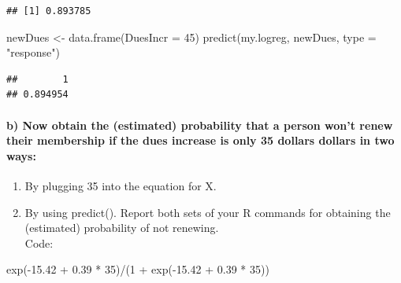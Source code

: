 \documentclass[
]{article}
\newenvironment{Shaded}{\begin{snugshade}}{\end{snugshade}}
\newcommand{\AttributeTok}[1]{\textcolor[rgb]{0.77,0.63,0.00}{#1}}
\newcommand{\DecValTok}[1]{\textcolor[rgb]{0.00,0.00,0.81}{#1}}
\newcommand{\FloatTok}[1]{\textcolor[rgb]{0.00,0.00,0.81}{#1}}
\newcommand{\FunctionTok}[1]{\textcolor[rgb]{0.00,0.00,0.00}{#1}}
\newcommand{\NormalTok}[1]{#1}
\newcommand{\OtherTok}[1]{\textcolor[rgb]{0.56,0.35,0.01}{#1}}
\newcommand{\SpecialCharTok}[1]{\textcolor[rgb]{0.00,0.00,0.00}{#1}}
\newcommand{\StringTok}[1]{\textcolor[rgb]{0.31,0.60,0.02}{#1}}
\providecommand{\tightlist}{%
  \setlength{\itemsep}{0pt}\setlength{\parskip}{0pt}}
\begin{document}
\begin{verbatim}
## [1] 0.893785
\end{verbatim}

\begin{Shaded}
\begin{Highlighting}[]
\NormalTok{newDues }\OtherTok{\textless{}{-}} \FunctionTok{data.frame}\NormalTok{(}\AttributeTok{DuesIncr =} \DecValTok{45}\NormalTok{)}
\FunctionTok{predict}\NormalTok{(my.logreg, newDues, }\AttributeTok{type =} \StringTok{"response"}\NormalTok{)}
\end{Highlighting}
\end{Shaded}

\begin{verbatim}
##        1 
## 0.894954
\end{verbatim}

\hypertarget{b-now-obtain-the-estimated-probability-that-a-person-wont-renew-their-membership-if-the-dues-increase-is-only-35-dollars-dollars-in-two-ways}{%
\paragraph{b) Now obtain the (estimated) probability that a person won't
renew their membership if the dues increase is only 35 dollars dollars
in two
ways:}\label{b-now-obtain-the-estimated-probability-that-a-person-wont-renew-their-membership-if-the-dues-increase-is-only-35-dollars-dollars-in-two-ways}}

\begin{enumerate}
\def\labelenumi{\arabic{enumi}.}
\tightlist
\item
  By plugging 35 into the equation for X.
\item
  By using predict(). Report both sets of your R commands for obtaining
  the (estimated) probability of not renewing.\\
  Code:
\end{enumerate}

\begin{Shaded}
\begin{Highlighting}[]
\FunctionTok{exp}\NormalTok{(}\SpecialCharTok{{-}}\FloatTok{15.42} \SpecialCharTok{+} \FloatTok{0.39} \SpecialCharTok{*} \DecValTok{35}\NormalTok{)}\SpecialCharTok{/}\NormalTok{(}\DecValTok{1} \SpecialCharTok{+} \FunctionTok{exp}\NormalTok{(}\SpecialCharTok{{-}}\FloatTok{15.42} \SpecialCharTok{+} \FloatTok{0.39} \SpecialCharTok{*} \DecValTok{35}\NormalTok{))}
\end{Highlighting}
\end{Shaded}
\end{document}
